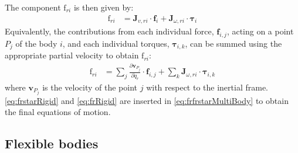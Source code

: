 \documentclass[wes, manuscript]{copernicus}
\renewcommand{\v}[1]{\boldsymbol{#1}}
\newcommand{\kanef}{\mathrm{f}}
\begin{document}
The component $\kanef_{ri}$ is then given by:
\begin{align}
   \kanef_{ri} &= \v{J}_{v,ri} \cdot \v{f}_i  + \v{J}_{\omega,ri} \cdot \v{\tau}_i
    \label{eq:frRigid}
\end{align}
Equivalently, the contributions from each individual force, $\v{f}_{i,j}$, acting on a point $P_j$ of the body $i$, and each individual torques, $\v{\tau}_{i,k}$, can be summed using the appropriate partial velocity to obtain $\kanef_{ri}$:
\begin{align}
   \kanef_{ri} &= \sum_j \frac{\partial \v{v}_{P_j}}{\partial \dot{q}_r} \cdot \v{f}_{i,j}  + \sum_k \v{J}_{\omega,ri} \cdot \v{\tau}_{i,k}
\end{align}
where $\v{v}_{P_j}$ is the velocity of the point $j$ with respect to the inertial frame.
\autoref{eq:frstarRigid} and \autoref{eq:frRigid}
are inserted in \autoref{eq:frfrstarMultiBody} to obtain the final equations of motion.




\subsection{Flexible bodies}
\label{sec:flexiblebodies}
\end{document}
